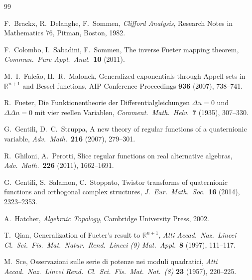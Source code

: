 \documentclass[11pt]{amsart}
\theoremstyle{definition}
\theoremstyle{remark}
\begin{document}
\begin{thebibliography}{99}

F.~Brackx, R.~Delanghe, F.~Sommen,
\emph{Clifford Analysis},
Research Notes in Mathematics 76, Pitman, Boston, 1982.

F.~Colombo, I.~Sabadini, F.~Sommen,
The inverse Fueter mapping theorem,
\emph{Commun.\ Pure Appl.\ Anal.}\ \textbf{10} (2011).

M.~I.~Falc\~ao, H.~R.~Malonek,
Generalized exponentials through Appell sets in $\mathbb{R}^{n+1}$ and
Bessel functions,
AIP Conference Proceedings \textbf{936} (2007), 738--741.

R.~Fueter,
Die Funktionentheorie der Differentialgleichungen $\Delta u=0$ und
$\Delta\Delta u=0$ mit vier reellen Variablen,
\emph{Comment.\ Math.\ Helv.}\ \textbf{7} (1935), 307--330.

G.~Gentili, D.~C.~Struppa,
A new theory of regular functions of a quaternionic variable,
\emph{Adv.\ Math.}\ \textbf{216} (2007), 279--301.

R.~Ghiloni, A.~Perotti,
Slice regular functions on real alternative algebras,
\emph{Adv.\ Math.}\ \textbf{226} (2011), 1662--1691.

G.~Gentili, S.~Salamon, C.~Stoppato,
Twistor transforms of quaternionic functions and orthogonal complex
structures,
\emph{J.\ Eur.\ Math.\ Soc.}\ \textbf{16} (2014), 2323--2353.

A.~Hatcher,
\emph{Algebraic Topology},
Cambridge University Press, 2002.

T.~Qian,
Generalization of Fueter's result to $\mathbb{R}^{n+1}$,
\emph{Atti Accad.\ Naz.\ Lincei Cl.\ Sci.\ Fis.\ Mat.\ Natur.\ Rend.\
Lincei (9) Mat.\ Appl.}\ \textbf{8} (1997), 111--117.

M.~Sce,
Osservazioni sulle serie di potenze nei moduli quadratici,
\emph{Atti Accad.\ Naz.\ Lincei Rend.\ Cl.\ Sci.\ Fis.\ Mat.\ Nat.\ (8)}
\textbf{23} (1957), 220--225.


\end{thebibliography}
\end{document}
